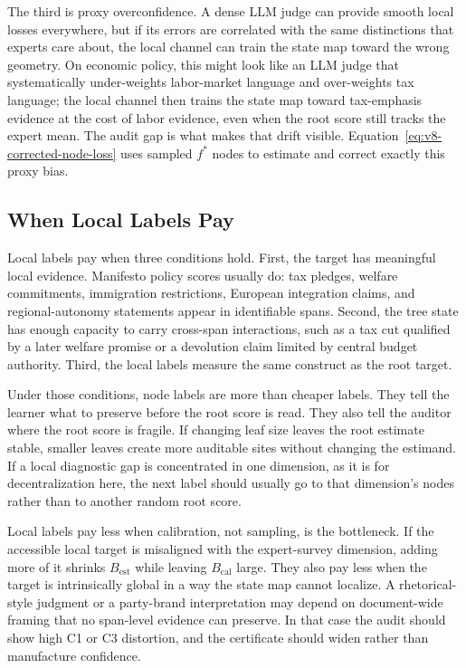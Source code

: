 The third is proxy overconfidence. A dense LLM judge can provide
smooth local losses everywhere, but if its errors are correlated
with the same distinctions that experts care about, the local
channel can train the state map toward the wrong geometry. On
economic policy, this might look like an LLM judge that
systematically under-weights labor-market language and over-weights
tax language; the local channel then trains the state map toward
tax-emphasis evidence at the cost of labor evidence, even when the
root score still tracks the expert mean. The audit gap is what
makes that drift visible.
Equation~\eqref{eq:v8-corrected-node-loss} uses sampled \(f^\ast\)
nodes to estimate and correct exactly this proxy bias.

\subsection{When Local Labels Pay}
\label{sec:v8-benoit-when-locals-pay}

Local labels pay when three conditions hold. First, the target has
meaningful local evidence. Manifesto policy scores usually do: tax
pledges, welfare commitments, immigration restrictions, European
integration claims, and regional-autonomy statements appear in
identifiable spans. Second, the tree state has enough capacity to
carry cross-span interactions, such as a tax cut qualified by a
later welfare promise or a devolution claim limited by central
budget authority. Third, the local labels measure the same
construct as the root target.

Under those conditions, node labels are more than cheaper labels.
They tell the learner what to preserve before the root score is
read. They also tell the auditor where the root score is fragile.
If changing leaf size leaves the root estimate stable, smaller
leaves create more auditable sites without changing the estimand.
If a local diagnostic gap is concentrated in one dimension, as it
is for decentralization here, the next label should usually go to
that dimension's nodes rather than to another random root score.

Local labels pay less when calibration, not sampling, is the
bottleneck. If the accessible local target is misaligned with the
expert-survey dimension, adding more of it shrinks
\(B_{\mathrm{est}}\) while leaving \(B_{\mathrm{cal}}\) large.
They also pay less when the target is intrinsically global in a
way the state map cannot localize. A rhetorical-style judgment or
a party-brand interpretation may depend on document-wide framing
that no span-level evidence can preserve. In that case the audit
should show high C1 or C3 distortion, and the certificate should
widen rather than manufacture confidence.
